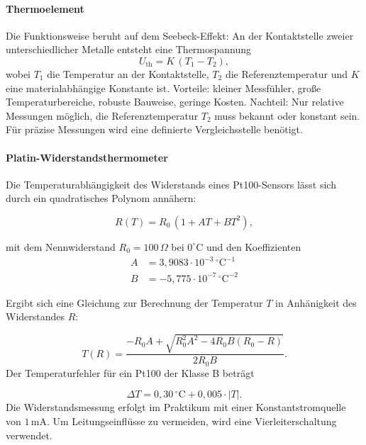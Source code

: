 \paragraph{Thermoelement}
Die Funktionsweise beruht auf dem Seebeck-Effekt: An der Kontaktstelle zweier unterschiedlicher Metalle entsteht eine Thermospannung
\begin{equation}
    U_{\mathrm{th}} = K \, (T_1 - T_2),
\end{equation}
wobei $T_1$ die Temperatur an der Kontaktstelle, $T_2$ die Referenztemperatur und $K$ eine materialabhängige Konstante ist.  
Vorteile: kleiner Messfühler, große Temperaturbereiche, robuste Bauweise, geringe Kosten.  
Nachteil: Nur relative Messungen möglich, die Referenztemperatur $T_2$ muss bekannt oder konstant sein. Für präzise Messungen wird eine definierte Vergleichsstelle benötigt.  

\paragraph{Platin-Widerstandsthermometer}
Die Temperaturabhängigkeit des Widerstands eines Pt100-Sensors lässt sich durch ein quadratisches Polynom annähern:

\begin{equation}
    R(T) = R_0 \,(1 + A T + B T^2),
    \label{eq:r_von_t}
\end{equation}

mit dem Nennwiderstand $R_0 = 100\,\Omega$ bei $0^\circ$C und den Koeffizienten 
\begin{align}
    A &= 3,9083 \cdot 10^{-3}\,\mathrm{^\circ C^{-1}} \\
    B &= -5,775 \cdot 10^{-7}\,\mathrm{^\circ C^{-2}}
\end{align}

Ergibt sich eine Gleichung zur Berechnung der Temperatur $T$ in Anhänigkeit des Widerstandes $R$:

\begin{equation}
    T(R) = \frac{-R_0A + \sqrt{R_0^2 A^2 - 4 R_0 B (R_0 - R)}}{2 R_0 B}.
    \label{eq:t_pt100}
\end{equation}
Der Temperaturfehler für ein Pt100 der Klasse B beträgt

\begin{equation}
    \Delta T = 0{,}30\,^\circ\mathrm{C} + 0{,}005 \cdot |T|.
\end{equation}
Die Widerstandsmessung erfolgt im Praktikum mit einer Konstantstromquelle von $1\,$mA. Um Leitungseinflüsse zu vermeiden, wird eine Vierleiterschaltung verwendet.

